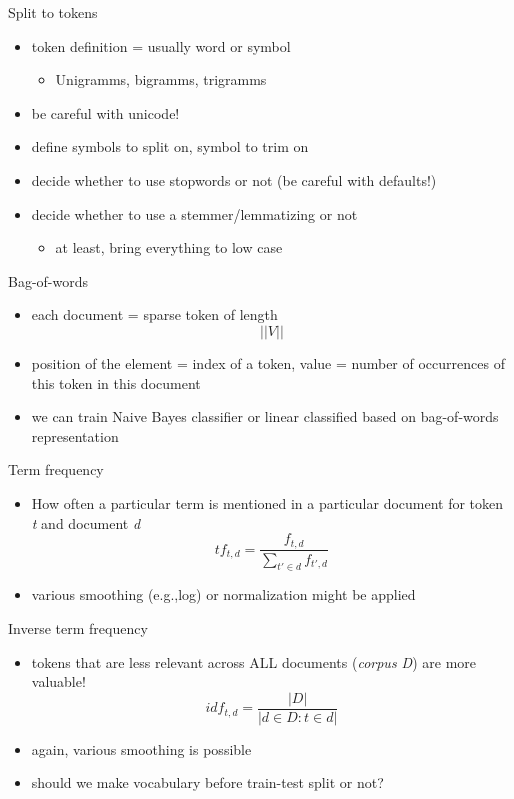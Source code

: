 \documentclass{beamer}
\begin{document}
\begin{frame}{Split to tokens}
  \begin{itemize}
  \item
    token definition = usually word or symbol
    \begin{itemize}
    \item
      Unigramms, bigramms, trigramms
    \end{itemize}
  \item
    be careful with unicode!
  \item
    define symbols to split on, symbol to trim on
  \item
    decide whether to use stopwords or not (be careful with defaults!)
  \item
    decide whether to use a stemmer/lemmatizing or not
    \begin{itemize}
    \item
      at least, bring everything to low case
    \end{itemize}
  \end{itemize}
\end{frame}

\begin{frame}{Bag-of-words}
    \begin{itemize}
        \item each document = sparse token of length \[||V||\]
        \item position of the element = index of a token, value = number of occurrences of this token in this document
        \item we can train Naive Bayes classifier or linear classified based on bag-of-words representation
    \end{itemize}
  
\end{frame}

\begin{frame}{Term frequency}
  \begin{itemize}
    \item
      How often a particular term is mentioned in a particular document for token \textit{t} and document \textit{d}
      \[tf_{t,d} = \frac{f_{t,d}}{\sum_{t'\in d}{f_{t',d}}} \]
    \item
      various smoothing (e.g.,log) or normalization might be applied
  \end{itemize}
\end{frame}

\begin{frame}{Inverse term frequency}
  \begin{itemize}
      \item
      tokens that are less relevant across ALL documents (\textit{corpus D}) are more valuable!
      \[idf_{t,d} = \frac{|D|}{|{d \in D: t \in d}|} \]
    \item
      again, various smoothing is possible
    \item
      should we make vocabulary before train-test split or not? 
  \end{itemize}
\end{frame}
\end{document}
